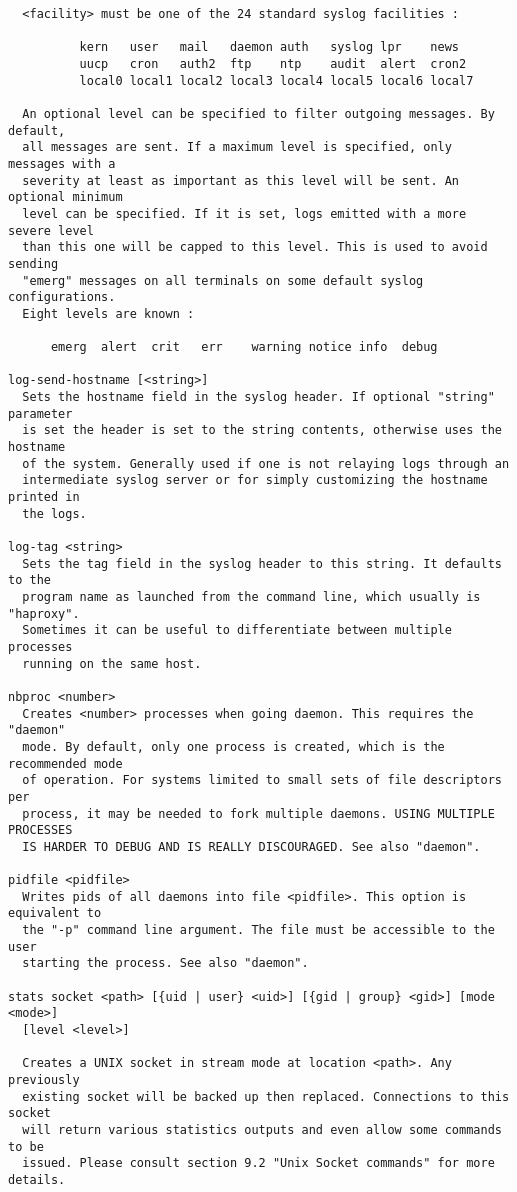 \begin{verbatim}
  <facility> must be one of the 24 standard syslog facilities :

          kern   user   mail   daemon auth   syslog lpr    news
          uucp   cron   auth2  ftp    ntp    audit  alert  cron2
          local0 local1 local2 local3 local4 local5 local6 local7

  An optional level can be specified to filter outgoing messages. By default,
  all messages are sent. If a maximum level is specified, only messages with a
  severity at least as important as this level will be sent. An optional minimum
  level can be specified. If it is set, logs emitted with a more severe level
  than this one will be capped to this level. This is used to avoid sending
  "emerg" messages on all terminals on some default syslog configurations.
  Eight levels are known :

	  emerg  alert  crit   err    warning notice info  debug

log-send-hostname [<string>]
  Sets the hostname field in the syslog header. If optional "string" parameter
  is set the header is set to the string contents, otherwise uses the hostname
  of the system. Generally used if one is not relaying logs through an
  intermediate syslog server or for simply customizing the hostname printed in
  the logs.

log-tag <string>
  Sets the tag field in the syslog header to this string. It defaults to the
  program name as launched from the command line, which usually is "haproxy".
  Sometimes it can be useful to differentiate between multiple processes
  running on the same host.

nbproc <number>
  Creates <number> processes when going daemon. This requires the "daemon"
  mode. By default, only one process is created, which is the recommended mode
  of operation. For systems limited to small sets of file descriptors per
  process, it may be needed to fork multiple daemons. USING MULTIPLE PROCESSES
  IS HARDER TO DEBUG AND IS REALLY DISCOURAGED. See also "daemon".

pidfile <pidfile>
  Writes pids of all daemons into file <pidfile>. This option is equivalent to
  the "-p" command line argument. The file must be accessible to the user
  starting the process. See also "daemon".

stats socket <path> [{uid | user} <uid>] [{gid | group} <gid>] [mode <mode>]
  [level <level>]

  Creates a UNIX socket in stream mode at location <path>. Any previously
  existing socket will be backed up then replaced. Connections to this socket
  will return various statistics outputs and even allow some commands to be
  issued. Please consult section 9.2 "Unix Socket commands" for more details.


\end{verbatim}
